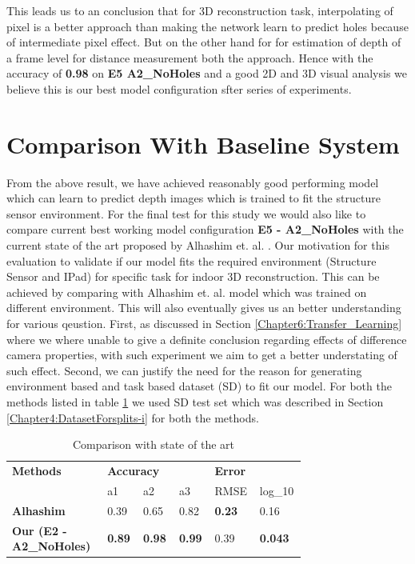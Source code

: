 This leads us to an conclusion that for 3D reconstruction task, interpolating of pixel is a better approach than making the network learn to predict holes because of intermediate pixel effect. But on the other hand for for estimation of depth of a frame level for distance measurement both the approach. Hence with the accuracy of \textbf{0.98} on \textbf{E5 A2\_NoHoles} and a good 2D and 3D visual analysis we believe this is our best model configuration sfter series of experiments.




\newpage
\section{Comparison With Baseline System}
 \label{Chapter6:ComapreS-F-A}


From the above result, we have achieved reasonably good performing model which can learn to predict depth images which is trained to fit the structure sensor environment. For the final test for this study we would also like to compare current best working model configuration \textbf{E5 - A2\_NoHoles} with the current state of the art proposed by Alhashim et. al. \cite{Alhashim2018}. Our motivation for this evaluation to validate if our model fits the required environment (Structure Sensor and IPad) for specific task for indoor 3D reconstruction. This can be achieved by comparing with Alhashim et. al. model which was trained on different environment. This will also eventually gives us an better understanding for various qeustion. First, as discussed in Section \ref{Chapter6:Transfer_Learning} where we where unable to give a definite conclusion regarding effects of difference camera properties, with such experiment we aim to get a better understating of such effect. Second, we can justify the need for the reason for generating environment based and task based dataset (SD) to fit our model. For both the methods listed in table \ref{table:Results_SFA} we used SD test set which was described in Section \ref{Chapter4:DatasetForsplits-i} for both the methods. 

\begin{table}[h]
\centering
\begin{tabular}{p{0.3\linewidth}p{0.1\linewidth}p{0.1\linewidth}p{0.08\linewidth}p{0.08\linewidth}p{0.07\linewidth}} \hline
\textbf{Methods} & \multicolumn{3}{l}{\textbf{Accuracy}} & {\textbf{Error}} \\ \cline{2-6} 
    &  a1& a2  & a3    & RMSE & log\_10   \\ \hline \hline
\textbf{Alhashim} \cite{Alhashim2018}    &  0.39 & 0.65   &  0.82  & \textbf{0.23}   &   0.16  \\ \hline

\textbf{Our (E2 - A2\_NoHoles)}     &   \textbf{0.89} & \textbf{0.98} & \textbf{0.99}   & 0.39  & \textbf{0.043}  \\ \hline

\end{tabular}
\caption{Comparison with state of the art}
\label{table:Results_SFA}
\end{table} 


